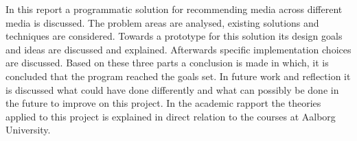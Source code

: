 In this report a programmatic solution for recommending media across different media is discussed. The problem areas are analysed, existing solutions and techniques are considered. Towards a prototype for this solution its design goals and ideas are discussed and explained. Afterwards specific implementation choices are discussed. Based on these three parts a conclusion is made in which, it is concluded that the program reached the goals set. 
In future work and reflection it is discussed what could have done differently and what can possibly be done in the future to improve on this project.
In the academic rapport the theories applied to this project is explained in direct relation to the courses at Aalborg University. 